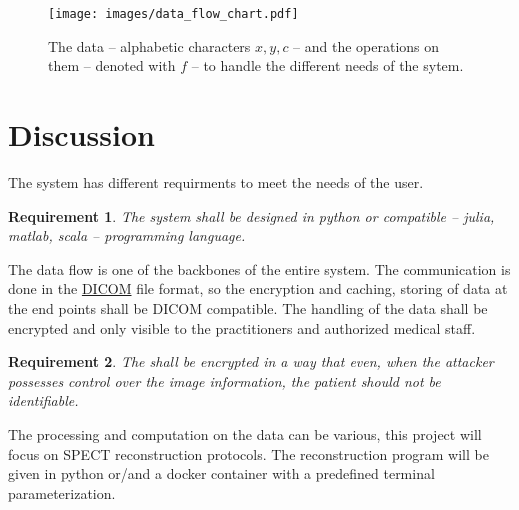 \documentclass[11pt]{article}
\newtheorem{reqn}{Requirement}
\begin{document}
\begin{figure}[t!]  
    
    \centering
    \texttt{[image: images/data\_flow\_chart.pdf]}
    
    \label{fig:data_operation_flow_chart}
    \caption{The data -- alphabetic characters $x, y, c$ -- and the operations on them -- denoted with $f$ -- to handle the different needs of the sytem.}\label{fig:data_op_flow}
\end{figure}

\section{Discussion}
The system has different requirments to meet the needs of the user. 

\begin{reqn}
    The system shall be designed in python or compatible -- julia, matlab, scala --  programming language. 
\end{reqn}

The data flow is one of the backbones of the entire system. The communication is done in the \href{https://www.dicomstandard.org/}{DICOM} file format, so the encryption and caching, storing of data at the end points shall be DICOM compatible. The handling of the data shall be encrypted and only visible to the practitioners and authorized medical staff. 

\begin{reqn}
    The shall be encrypted in a way that even, when the attacker possesses control over the image information, the patient should not be identifiable. 
\end{reqn}

The processing and computation on the data can be various, this project will focus on SPECT reconstruction protocols. The reconstruction program will be given in python or/and a docker container with a predefined terminal parameterization.
\end{document}
